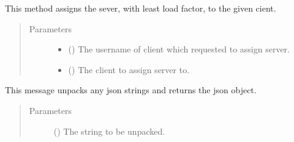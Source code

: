 \documentclass[letterpaper,10pt,english]{sphinxmanual}
\begin{document}
\begin{fulllineitems}
\label{\detokenize{balancerHelper:balancerHelper.serverAssign}}
This method assigns the sever, with least load factor, to the given cient.
\begin{quote}\begin{description}
\item[{Parameters}] \leavevmode\begin{itemize}
\item {} 
 () \textendash{} The username of client which requested to assign server.

\item {} 
 () \textendash{} The client to assign server to.

\end{itemize}

\end{description}\end{quote}

\end{fulllineitems}


\begin{fulllineitems}
\label{\detokenize{balancerHelper:balancerHelper.unpackJSON}}
This message unpacks any json strings and returns the json object.
\begin{quote}\begin{description}
\item[{Parameters}] \leavevmode
{} () \textendash{} The string to be unpacked.

\end{description}\end{quote}

\end{fulllineitems}
\end{document}
